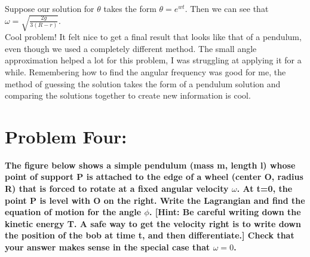 \documentclass[10pt]{article} %
\begin{document}
Suppose our solution for $\theta$ takes the form $\theta = e^{wt}$. Then we can see that $\omega = \sqrt{\frac{2g}{3(R-r)}}$.\\

Cool problem! It felt nice to get a final result that looks like that of a pendulum, even though we used a completely different method. The small angle approximation helped a lot for this problem, I was struggling at applying it for a while. Remembering how to find the angular frequency was good for me, the method of guessing the solution takes the form of a pendulum solution and comparing the solutions together to create new information is cool.\\

\section{Problem Four: }
\textbf{The figure below shows a simple pendulum (mass m, length l) whose point of support P is attached to the edge of a wheel (center O, radius R) that is forced to rotate at a fixed angular velocity $\omega$. At t=0, the point P is level with O on the right. Write the Lagrangian and find the equation of motion for the angle $\phi$. [Hint: Be careful writing down the kinetic energy T. A safe way to get the velocity right is to write down the position of the bob at time t, and then differentiate.] Check that your answer makes sense in the special case that $\omega=0$.}
\end{document}
